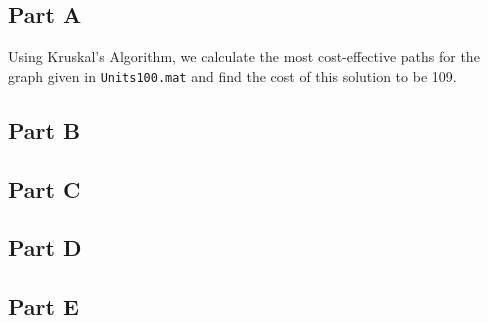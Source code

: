 \documentclass[a4paper]{article}
\begin{document}



\subsection{Part A}


Using Kruskal's Algorithm, we calculate the most cost-effective paths for the
graph given in \texttt{Units100.mat} and find the cost of this solution to be
109.

\subsection{Part B}


\subsection{Part C}


\subsection{Part D}


\subsection{Part E}

\end{document}
